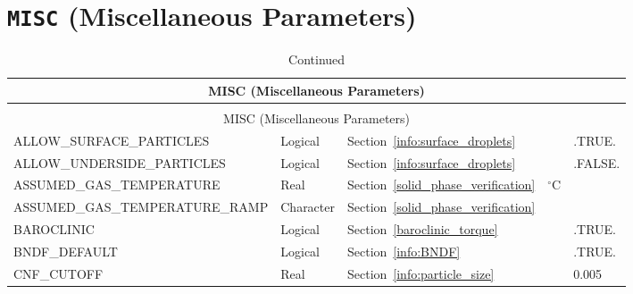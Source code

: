 \documentclass[11pt]{book}
\begin{document}
\vspace{\baselineskip}



\section{\texorpdfstring{{\tt MISC}}{MISC} (Miscellaneous Parameters)}


\begin{longtable}{@{\extracolsep{\fill}}|l|l|l|l|l|}
\caption[Miscellaneous parameters ({\ct MISC} namelist group)]{For more information see Section~\ref{info:MISC}.}
\label{tbl:MISC} \\
\hline
\multicolumn{5}{|c|}{{\ct MISC} (Miscellaneous Parameters)} \\
\hline \hline
\endfirsthead
\caption[]{Continued} \\
\hline
\multicolumn{5}{|c|}{{\ct MISC} (Miscellaneous Parameters)} \\
\hline \hline
\endhead
{\ct \footnotesize ALLOW\_SURFACE\_PARTICLES}   & Logical       & Section~\ref{info:surface_droplets}                   &               & {\ct .TRUE.}      \\ \hline
{\ct \footnotesize ALLOW\_UNDERSIDE\_PARTICLES} & Logical       & Section~\ref{info:surface_droplets}                   &               & {\ct .FALSE.}     \\ \hline
{\ct \footnotesize ASSUMED\_GAS\_TEMPERATURE}   & Real          & Section~\ref{solid_phase_verification}                & $^\circ$C     &                   \\ \hline
{\ct \footnotesize ASSUMED\_GAS\_TEMPERATURE\_RAMP}& Character  & Section~\ref{solid_phase_verification}                &               &                   \\ \hline
{\ct BAROCLINIC}                                & Logical       & Section~\ref{baroclinic_torque}                       &               & {\ct .TRUE.}      \\ \hline
{\ct BNDF\_DEFAULT}                             & Logical       & Section~\ref{info:BNDF}                               &               & {\ct .TRUE.}      \\ \hline
{\ct CNF\_CUTOFF}                               & Real          & Section~\ref{info:particle_size}                      &               & 0.005             \\ \hline

\end{longtable}
\end{document}
